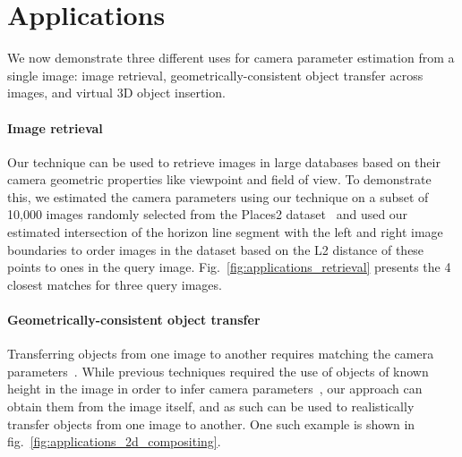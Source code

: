 \section{Applications}

We now demonstrate three different uses for camera parameter estimation from a single image: image retrieval, geometrically-consistent object transfer across images, and virtual 3D object insertion.

\paragraph{Image retrieval}

Our technique can be used to retrieve images in large databases based on their camera geometric properties like viewpoint and field of view. To demonstrate this, we estimated the camera parameters using our technique on a subset of 10,000 images randomly selected from the Places2 dataset~\cite{Zhou2017} and used our estimated intersection of the horizon line segment with the left and right image boundaries to order images in the dataset based on the L2 distance of these points to ones in the query image. Fig.~\ref{fig:applications_retrieval} presents the 4 closest matches for three query images.

\paragraph{Geometrically-consistent object transfer}

Transferring objects from one image to another requires matching the camera parameters~\cite{lalonde-siggraph-07}. While previous techniques required the use of objects of known height in the image in order to infer camera parameters~\cite{lalonde-siggraph-07}, our approach can obtain them from the image itself, and as such can be used to realistically transfer objects from one image to another. One such example is shown in fig.~\ref{fig:applications_2d_compositing}. 

